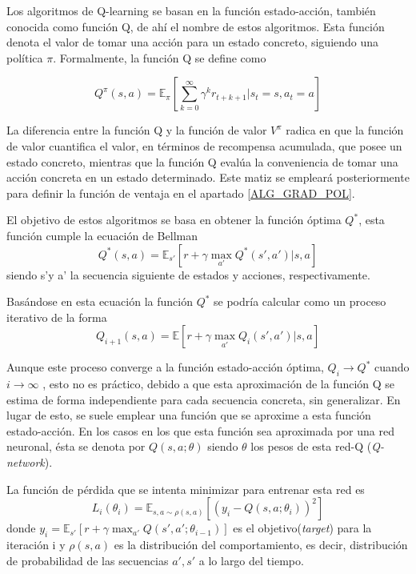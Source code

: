 Los algoritmos de Q-learning se basan en la función estado-acción, también conocida como función Q, de ahí el nombre de estos algoritmos. Esta función denota el valor de tomar una acción para un estado concreto, siguiendo una política $\pi$. Formalmente, la función Q se define como

\begin{equation}
	Q^\pi(s,a) =  \mathbb{E}_\pi\left[\sum_{k=0}^{\infty}{\gamma^k r_{t+k+1}}\Big|s_t=s,a_t = a\right]
\end{equation}

La diferencia entre la función Q y la función de valor $V^\pi$ radica en que la función de valor cuantifica el valor, en términos de recompensa acumulada, que posee un estado concreto, mientras que la función Q evalúa la conveniencia de tomar una acción concreta en un estado determinado. Este matiz se empleará posteriormente para definir la función de ventaja en el apartado \ref{ALG_GRAD_POL}.

El objetivo de estos algoritmos se basa en obtener la función óptima $Q^*$, esta función cumple la ecuación de Bellman 
	\begin{equation}
		Q^*(s,a)= \mathbb{E}_{s'}\left[r+\gamma\;\underset{a'}{\text{max}}\; Q^*(s',a')\big|s,a\right]
	\end{equation}
siendo s'y a' la secuencia siguiente de estados y acciones, respectivamente.

Basándose en esta ecuación la función $Q^*$ se podría calcular como un proceso iterativo de la forma
	\begin{equation}
	Q_{i+1}(s,a)= \mathbb{E}\left[r+\gamma\;\underset{a'}{\text{max}}\; Q_i(s',a')\big|s,a\right]
	\end{equation}

Aunque este proceso converge a la función estado-acción óptima, $Q_i \rightarrow Q^*$ cuando $i \rightarrow \infty$ \cite{sutton2018reinforcement}, esto no es práctico, debido a que esta aproximación de la función Q se estima de forma independiente para cada secuencia concreta, sin generalizar. En lugar de esto, se suele emplear una función que se aproxime a esta función estado-acción. En los casos en los que esta función sea aproximada por una red neuronal, ésta se denota por $Q(s,a; \theta)$ siendo $\theta$ los pesos de esta red-Q (\textit{Q-network}). 

La función de pérdida que se intenta minimizar para entrenar esta red es
\begin{equation}\label{eq:1}
	L_i(\theta_i) = \mathbb{E}_{s,a\sim\rho(s,a)}\left[\left(y_i - Q(s,a;\theta_i)\right)^2\right]
\end{equation} 
donde $y_i= \mathbb{E}_{s'}[ r + \gamma \; {\text{max}_{a'}} \; Q(s',a';\theta_{i-1})]$ es el objetivo(\textit{target}) para la iteración i y $\rho(s,a)$ es la distribución del comportamiento, es decir, distribución de probabilidad de las secuencias $a', s'$ a lo largo del tiempo.

